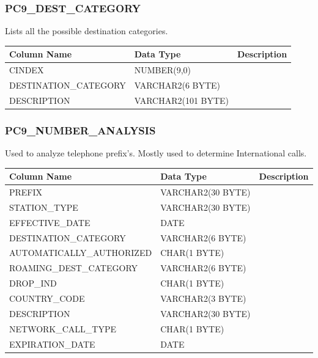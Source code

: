 \documentclass[12pt,twoside]{article}
\begin{document}
\normalsize
\subsubsection{PC9\_DEST\_CATEGORY}
\label{sec-9-14-10}

   Lists all the possible destination categories.
\scriptsize

\begin{center}
\begin{tabular}{lll}
\hline
 \textbf{Column Name}   &  \textbf{Data Type}  &  \textbf{Description}  \\
\hline
 CINDEX                 &  NUMBER(9,0)         &                        \\
 DESTINATION\_CATEGORY  &  VARCHAR2(6 BYTE)    &                        \\
 DESCRIPTION            &  VARCHAR2(101 BYTE)  &                        \\
\hline
\end{tabular}
\end{center}



\normalsize
\subsubsection{PC9\_NUMBER\_ANALYSIS}
\label{sec-9-14-11}

   Used to analyze telephone prefix's. Mostly used to determine
   International calls.
\scriptsize

\begin{center}
\begin{tabular}{lll}
\hline
 \textbf{Column Name}       &  \textbf{Data Type}  &  \textbf{Description}  \\
\hline
 PREFIX                     &  VARCHAR2(30 BYTE)   &                        \\
 STATION\_TYPE              &  VARCHAR2(30 BYTE)   &                        \\
 EFFECTIVE\_DATE            &  DATE                &                        \\
 DESTINATION\_CATEGORY      &  VARCHAR2(6 BYTE)    &                        \\
 AUTOMATICALLY\_AUTHORIZED  &  CHAR(1 BYTE)        &                        \\
 ROAMING\_DEST\_CATEGORY    &  VARCHAR2(6 BYTE)    &                        \\
 DROP\_IND                  &  CHAR(1 BYTE)        &                        \\
 COUNTRY\_CODE              &  VARCHAR2(3 BYTE)    &                        \\
 DESCRIPTION                &  VARCHAR2(30 BYTE)   &                        \\
 NETWORK\_CALL\_TYPE        &  CHAR(1 BYTE)        &                        \\
 EXPIRATION\_DATE           &  DATE                &                        \\
\hline
\end{tabular}
\end{center}
\end{document}

